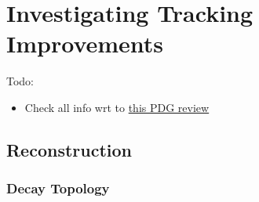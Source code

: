 \chapter{ Investigating Tracking Improvements}\label{chap:tracking}

Todo:
\begin{itemize}
    \item Check all info wrt to \href{https://pdg.lbl.gov/2018/reviews/rpp2018-rev-b-meson-prod-decay.pdf}{this PDG review}
\end{itemize}


\section{\bhadron Reconstruction}\label{sec:b reconstruction}

\subsection{\bhadron Decay Topology}\label{sec:b decay topolgy}

